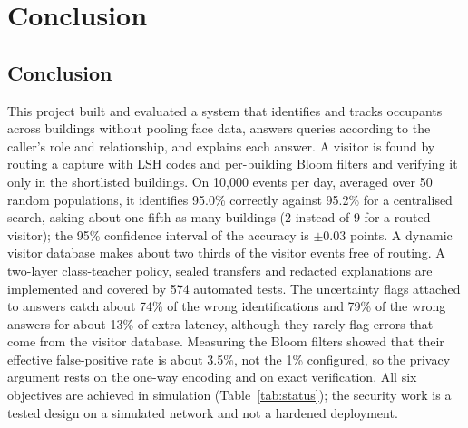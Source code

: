 \documentclass[12pt,a4paper,oneside]{report}
\begin{document}
\clearpage
\chapter{Conclusion}
\section{Conclusion}
This project built and evaluated a system that identifies and tracks occupants across buildings without pooling face data, answers queries according to the caller's role and relationship, and explains each answer. A visitor is found by routing a capture with LSH codes and per-building Bloom filters and verifying it only in the shortlisted buildings. On 10,000 events per day, averaged over 50 random populations, it identifies 95.0\% correctly against 95.2\% for a centralised search, asking about one fifth as many buildings (2 instead of 9 for a routed visitor); the 95\% confidence interval of the accuracy is $\pm0.03$ points. A dynamic visitor database makes about two thirds of the visitor events free of routing. A two-layer class-teacher policy, sealed transfers and redacted explanations are implemented and covered by 574 automated tests. The uncertainty flags attached to answers catch about 74\% of the wrong identifications and 79\% of the wrong answers for about 13\% of extra latency, although they rarely flag errors that come from the visitor database. Measuring the Bloom filters showed that their effective false-positive rate is about 3.5\%, not the 1\% configured, so the privacy argument rests on the one-way encoding and on exact verification. All six objectives are achieved in simulation (Table~\ref{tab:status}); the security work is a tested design on a simulated network and not a hardened deployment.
\end{document}
